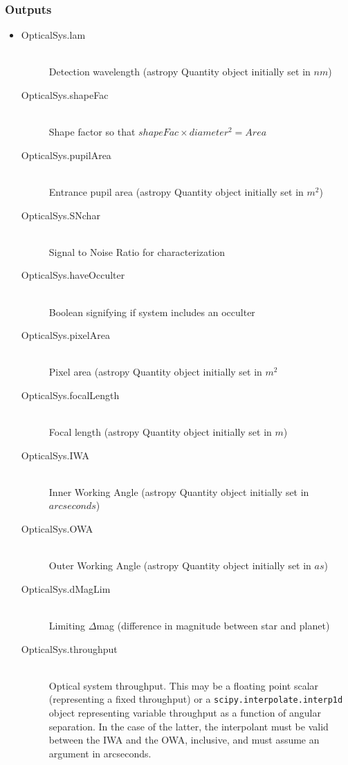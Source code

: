 \documentclass[cleanfoot]{asme2ej}
\begin{document}
\subsubsection*{Outputs}
\begin{itemize}
    \item 
    \begin{description}
        \item[OpticalSys.lam] \hfill \\
        Detection wavelength (astropy Quantity object initially set in $ nm $)
        \item[OpticalSys.shapeFac] \hfill \\
        Shape factor so that $ shapeFac \times diameter^2 = Area $
        \item[OpticalSys.pupilArea] \hfill \\
        Entrance pupil area (astropy Quantity object initially set in $ m^{2} $)
        \item[OpticalSys.SNchar] \hfill \\
        Signal to Noise Ratio for characterization
        \item[OpticalSys.haveOcculter] \hfill \\
        Boolean signifying if system includes an occulter
        \item[OpticalSys.pixelArea] \hfill \\
        Pixel area (astropy Quantity object initially set in $ m^{2} $
        \item[OpticalSys.focalLength] \hfill \\
        Focal length (astropy Quantity object initially set in $ m $)
        \item[OpticalSys.IWA] \hfill \\
        Inner Working Angle (astropy Quantity object initially set in $ arcseconds $)
        \item[OpticalSys.OWA] \hfill \\
        Outer Working Angle (astropy Quantity object initially set in $ as $)
        \item[OpticalSys.dMagLim] \hfill \\
        Limiting $ \Delta$mag (difference in magnitude between star and planet)
        \item[OpticalSys.throughput] \hfill \\
        Optical system throughput. This may be a floating point scalar (representing a fixed throughput) or a \verb+scipy.interpolate.interp1d+ object representing variable throughput as a function of angular separation.  In the case of the latter, the interpolant must be valid between the IWA and the OWA, inclusive, and must assume an argument in arcseconds.

\end{description}
\end{itemize}
\end{document}
